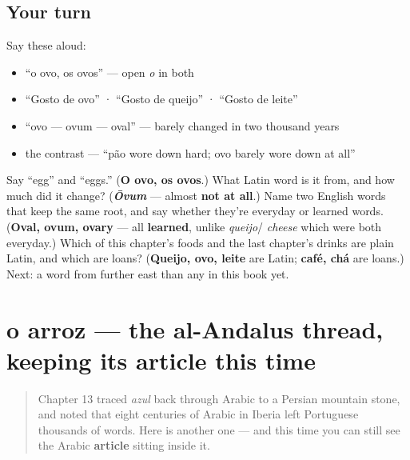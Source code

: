 \subsection*{Your turn}
Say these aloud:

\begin{itemize}
\raggedright
  \item \textquotedblleft{}o ovo, os ovos\textquotedblright{} — open \emph{o} in both
  \item \textquotedblleft{}Gosto de ovo\textquotedblright{} · \textquotedblleft{}Gosto de queijo\textquotedblright{} · \textquotedblleft{}Gosto de leite\textquotedblright{}
  \item \textquotedblleft{}ovo — ovum — oval\textquotedblright{} — barely changed in two thousand years
  \item the contrast — \textquotedblleft{}pão wore down hard; ovo barely wore down at all\textquotedblright{}
\end{itemize}

\begin{tcolorbox}[breakable,colback=teal!4,colframe=teal!35!black,title={Before you move on}]
Say \textquotedblleft{}egg\textquotedblright{} and \textquotedblleft{}eggs.\textquotedblright{} (\textbf{O ovo, os ovos}.) What Latin word is it from, and how much did it change? (\emph{\textbf{Ōvum}} — almost \textbf{not at all}.) Name two English words that keep the same root, and say whether they're everyday or learned words. (\textbf{Oval, ovum, ovary} — all \textbf{learned}, unlike \emph{queijo}/ \emph{cheese} which were both everyday.) Which of this chapter's foods and the last chapter's drinks are plain Latin, and which are loans? (\textbf{Queijo, ovo, leite} are Latin; \textbf{café, chá} are loans.) Next: a word from further east than any in this book yet.
\end{tcolorbox}
\section[o arroz]{o arroz — the al-Andalus thread, keeping its article this time}

\label{lesson:PT-C24-arroz}



\begin{quote}
Chapter 13 traced \emph{azul} back through Arabic to a Persian mountain stone, and noted that eight centuries of Arabic in Iberia left Portuguese thousands of words. Here is another one — and this time you can still see the Arabic \textbf{article} sitting inside it.
\end{quote}

